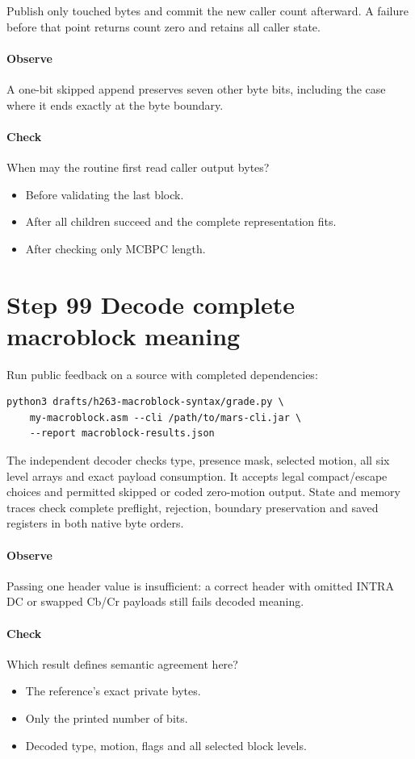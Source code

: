 Publish only touched bytes and commit the new caller count afterward. A failure
before that point returns count zero and retains all caller state.

\paragraph{Observe} A one-bit skipped append preserves seven other byte bits,
including the case where it ends exactly at the byte boundary.
\paragraph{Check} When may the routine first read caller output bytes?
\begin{itemize}
  \item[A.] Before validating the last block.
  \item[B.] After all children succeed and the complete representation fits.
  \item[C.] After checking only MCBPC length.
\end{itemize}

\section{Step 99 Decode complete macroblock meaning}\label{h263-syntax-s09}
Run public feedback on a source with completed dependencies:
\begin{verbatim}
python3 drafts/h263-macroblock-syntax/grade.py \
    my-macroblock.asm --cli /path/to/mars-cli.jar \
    --report macroblock-results.json
\end{verbatim}
The independent decoder checks type, presence mask, selected motion, all six
level arrays and exact payload consumption. It accepts legal compact/escape
choices and permitted skipped or coded zero-motion output. State and memory traces
check complete preflight, rejection, boundary preservation and saved registers
in both native byte orders.

\paragraph{Observe} Passing one header value is insufficient: a correct header
with omitted INTRA DC or swapped Cb/Cr payloads still fails decoded meaning.
\Needspace{8\baselineskip}
\paragraph{Check} Which result defines semantic agreement here?
\begin{itemize}
  \item[A.] The reference's exact private bytes.
  \item[B.] Only the printed number of bits.
  \item[C.] Decoded type, motion, flags and all selected block levels.
\end{itemize}

